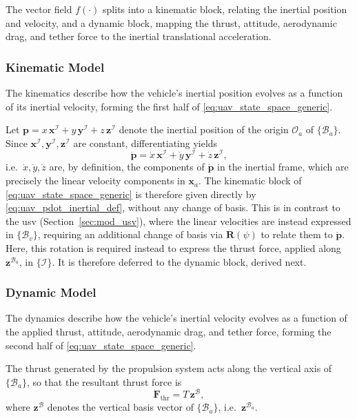 The vector field $f(\cdot)$ splits into a kinematic block, relating the inertial position and velocity, and a dynamic block, mapping the thrust, attitude, aerodynamic drag, and tether force to the inertial translational acceleration.

\subsubsection{Kinematic Model}
\label{subsec:mod_uav_kinematics}
The kinematics describe how the vehicle's inertial position evolves as a function of its inertial velocity, forming the first half of \eqref{eq:uav_state_space_generic}.

Let $\mathbf{p} = x\,\mathbf{x}^{\mathcal{I}} + y\,\mathbf{y}^{\mathcal{I}} + z\,\mathbf{z}^{\mathcal{I}}$ denote the inertial position of the origin $\mathcal{O}_a$ of $\{\mathcal{B}_a\}$. Since $\mathbf{x}^{\mathcal{I}}, \mathbf{y}^{\mathcal{I}}, \mathbf{z}^{\mathcal{I}}$ are constant, differentiating yields
\begin{equation}
    \label{eq:uav_pdot_inertial_def}
    \dot{\mathbf{p}} = \dot{x}\,\mathbf{x}^{\mathcal{I}} + \dot{y}\,\mathbf{y}^{\mathcal{I}} + \dot{z}\,\mathbf{z}^{\mathcal{I}},
\end{equation}
i.e.\ $\dot{x}, \dot{y}, \dot{z}$ are, by definition, the components of $\dot{\mathbf{p}}$ in the inertial frame, which are precisely the linear velocity components in $\mathbf{x}_a$. The kinematic block of \eqref{eq:uav_state_space_generic} is therefore given directly by \eqref{eq:uav_pdot_inertial_def}, without any change of basis. This is in contrast to the \gls{usv} (Section~\ref{sec:mod_usv}), where the linear velocities are instead expressed in $\{\mathcal{B}_v\}$, requiring an additional change of basis via $\mathbf{R}(\psi)$ to relate them to $\dot{\mathbf p}$. Here, this rotation is required instead to express the thrust force, applied along $\mathbf{z}^{\mathcal{B}_a}$, in $\{\mathcal{I}\}$. It is therefore deferred to the dynamic block, derived next.

\subsubsection{Dynamic Model}
\label{subsec:mod_uav_dynamics}
The dynamics describe how the vehicle's inertial velocity evolves as a function of the applied thrust, attitude, aerodynamic drag, and tether force, forming the second half of \eqref{eq:uav_state_space_generic}.

The thrust generated by the propulsion system acts along the vertical axis of $\{\mathcal{B}_a\}$, so that the resultant thrust force is
\begin{equation}
    \mathbf{F}_{\mathrm{thr}} = T\,\mathbf{z}^{\mathcal{B}},
    \label{eq:uav_thrust_body}
\end{equation}
where $\mathbf{z}^{\mathcal{B}}$ denotes the vertical basis vector of $\{\mathcal{B}_a\}$, i.e.\ $\mathbf{z}^{\mathcal{B}_a}$.

